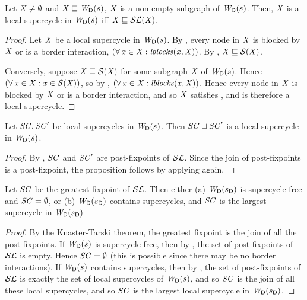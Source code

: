 \begin{proposition} \label{prop:locGFP} \label{prop:supercycleGFPLoc}
Let $\XS \ne \ewfg$ and $\XS \subg \lwfg{B}{s}{\DS}$, \ie $\XS$ is a non-empty subgraph of $\lwfg{\B}{s}{\DS}$.
Then, $\XS$ is a local supercycle in $\lwfg{\B}{s}{\DS}$ iff $\XS \subg \lSF{\XS}$.
\end{proposition}
%
\begin{proof}
Let $\XS$ be a local supercycle in $\lwfg{B}{s}{\DS}$. By , every node in $\XS$ is blocked by $\XS$ or is a border interaction, \ie 
$(\fa \ndx \in \XS: \lblocks{\ndx}{\XS})$. By , $\XS \subg \SF{\XS}$.

Conversely, suppose $\XS \subg \SF{\XS}$ for some subgraph $\XS$ of $\lwfg{B}{s}{\DS}$. Hence 
$(\fa \ndx \in \XS: \ndx \in \SF{\XS})$, so by , $(\fa \ndx \in \XS: \lblocks{\ndx}{\XS})$.
Hence every node in $\XS$ is blocked by $\XS$ or is a border interaction, and so $\XS$ satisfies , and is therefore a local supercycle.
\end{proof}

\begin{proposition} \label{prop:supercycleLoc:union}
Let $\SC, \SC'$ be local supercycles in $\lwfg{B}{s}{\DS}$. Then $\SC \join \SC'$ is
a local supercycle in $\lwfg{B}{s}{\DS}$.
\end{proposition}
%
\begin{proof}
By , $\SC$ and $\SC'$ are post-fixpoints of $\lSFs$. Since the join of post-fixpoints is a post-fixpoint, 
the proposition follows by applying  again.
\end{proof}


\begin{proposition} \label{prop:GFPisLargestSCLoc}
Let $\SC$ be the greatest fixpoint of $\lSFs$. Then either
(a) $\lwfg{\B}{\sD}{\DS}$ is supercycle-free and $\SC = \ewfg$, or 
(b) $\lwfg{\B}{\sD}{\DS}$ contains supercycles, and $\SC$ is the largest supercycle in $\lwfg{\B}{\sD}{\DS}$ 
\end{proposition}
%
\begin{proof}
By the Knaster-Tarski theorem, the greatest fixpoint is the join of all the post-fixpoints. 
If $\lwfg{B}{s}{\DS}$ is supercycle-free, then by , the set of post-fixpoints of $\lSFs$ is empty. 
Hence $\SC = \ewfg$ (this is possible since there may be no border interactions). %
If $\lwfg{B}{s}{\DS}$ contains supercycles, then by ,  the set of post-fixpoints of $\lSFs$ is exactly the set of 
local supercycles of $\lwfg{B}{s}{\DS}$, and so $\SC$ is the join of all these local supercycles, and so $\SC$ is the largest local supercycle in 
$\lwfg{\B}{\sD}{\DS}$.
\end{proof}



